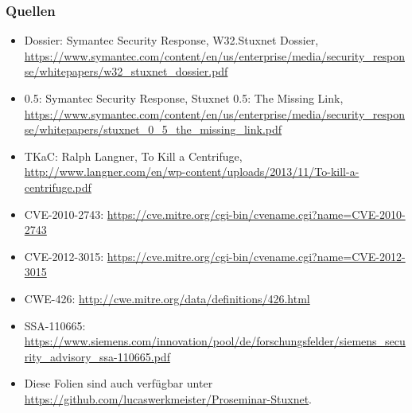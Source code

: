 \documentclass{beamer}
\begin{document}
\begin{frame}
  \frametitle{Quellen}
  \fontsize{6pt}{7.2}\selectfont
  \begin{itemize}
    \item Dossier: Symantec Security Response, W32.Stuxnet Dossier, \url{https://www.symantec.com/content/en/us/enterprise/media/security_response/whitepapers/w32_stuxnet_dossier.pdf}
    \item 0.5: Symantec Security Response, Stuxnet 0.5: The Missing Link, \url{https://www.symantec.com/content/en/us/enterprise/media/security_response/whitepapers/stuxnet_0_5_the_missing_link.pdf}
    \item TKaC: Ralph Langner, To Kill a Centrifuge, \url{http://www.langner.com/en/wp-content/uploads/2013/11/To-kill-a-centrifuge.pdf}
    \item CVE-2010-2743: \url{https://cve.mitre.org/cgi-bin/cvename.cgi?name=CVE-2010-2743}
    \item CVE-2012-3015: \url{https://cve.mitre.org/cgi-bin/cvename.cgi?name=CVE-2012-3015}
    \item CWE-426: \url{http://cwe.mitre.org/data/definitions/426.html}
    \item SSA-110665: \url{https://www.siemens.com/innovation/pool/de/forschungsfelder/siemens_security_advisory_ssa-110665.pdf}
    \item Diese Folien sind auch verfügbar unter \url{https://github.com/lucaswerkmeister/Proseminar-Stuxnet}.
  \end{itemize}
\end{frame}
\end{document}
